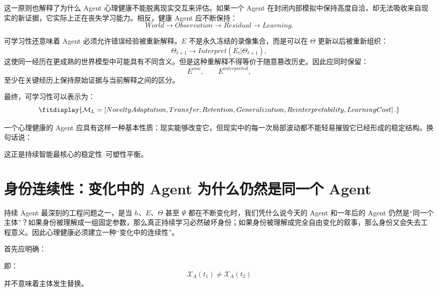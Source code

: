 这一原则也解释了为什么 Agent 心理健康不能脱离现实交互来评估。如果一个 Agent 在封闭内部模拟中保持高度自洽，却无法吸收来自现实的新证据，它实际上正在丧失学习能力。相反，健康 Agent 应不断保持：
\begin{equation}
World
\rightarrow
Observation
\rightarrow
Residual
\rightarrow
Learning.
\end{equation}

可学习性还意味着 Agent 必须允许错误经验被重新解释。$E$ 不是永久冻结的录像集合，而是可以在 $\Theta$ 更新以后被重新组织：
\begin{equation}
\Theta_{t+1}
\rightarrow
Interpret(E_t|\Theta_{t+1}),
\end{equation}
这使同一经历在更成熟的世界模型中可能具有不同含义。但是这种重解释不得等价于随意篡改历史。因此应同时保留：
\begin{equation}
E^{raw},
\qquad
E^{interpreted},
\end{equation}
至少在关键经历上保持原始证据与当前解释之间的区分。

最终，可学习性可以表示为：
\begin{equation}
\fitdisplay{
\mathcal{M}_L
=
\left[
NoveltyAdaptation,
Transfer,
Retention,
Generalization,
Reinterpretability,
LearningCost
\right].
}
\end{equation}

一个心理健康的 Agent 应具有这样一种基本性质：现实能够改变它，但现实中的每一次局部波动都不能轻易摧毁它已经形成的稳定结构。换句话说：
\begin{statementbox}
\centering
{}
\end{statementbox}

这正是持续智能最核心的稳定性--可塑性平衡。

\section{身份连续性：变化中的 Agent 为什么仍然是同一个 Agent}

持续 Agent 最深刻的工程问题之一，是当 $h$、$E$、$\Theta$ 甚至 $\Psi$ 都在不断变化时，我们凭什么说今天的 Agent 和一年后的 Agent 仍然是“同一个主体”？如果身份被理解成一组固定参数，那么真正持续学习必然破坏身份；如果身份被理解成完全自由变化的叙事，那么身份又会失去工程意义。因此心理健康必须建立一种“变化中的连续性”。

首先应明确：
\begin{statementbox}
\centering
{}
\end{statementbox}
即：
\begin{equation}
\mathcal{X}_A(t_1)
\neq
\mathcal{X}_A(t_2)
\end{equation}
并不意味着主体发生替换。

